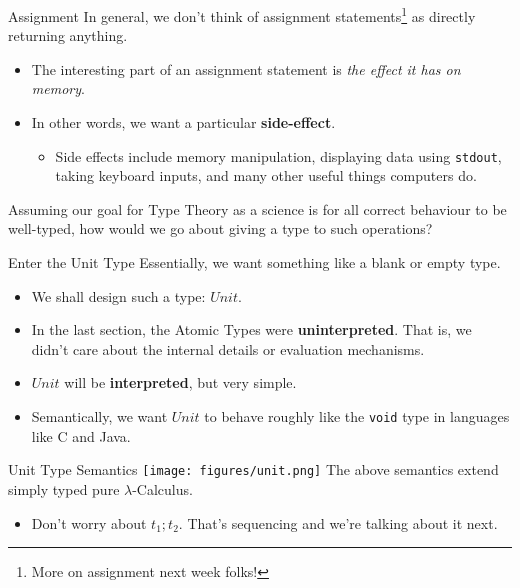 \documentclass[11pt]{beamer}
\begin{document}
\begin{frame}[fragile=singleslide]{Assignment}
In general, we don't think of assignment statements\footnote{More on assignment next week folks!} as directly returning anything.
\begin{itemize}
\item The interesting part of an assignment statement is \emph{the effect it has on memory}.
\item In other words, we want a particular \textbf{side-effect}.
\begin{itemize}
 \item Side effects include memory manipulation, displaying data using \texttt{stdout}, taking keyboard inputs, and many other useful things computers do.
 \end{itemize}
\end{itemize}
Assuming our goal for Type Theory as a science is for all correct behaviour to be well-typed, how would we go about giving a type to such operations?
\end{frame}

\begin{frame}[fragile=singleslide]{Enter the Unit Type}
Essentially, we want something like a blank or empty type.
\begin{itemize}
\item We shall design such a type: $Unit$.
\item In the last section, the Atomic Types were \textbf{uninterpreted}.  That is, we didn't care about the internal details or evaluation mechanisms.
\item $Unit$ will be \textbf{interpreted}, but very simple.  
\item Semantically, we want $Unit$ to behave roughly like the \texttt{void} type in languages like C and Java.
\end{itemize}
\end{frame}

\begin{frame}[fragile=singleslide]{Unit Type Semantics}
\texttt{[image: figures/unit.png]} 
The above semantics extend simply typed pure $\lambda$-Calculus. 
\begin{itemize}
\item Don't worry about $t_1 ; t_2$.  That's sequencing and we're talking about it next. 
 \end{itemize} 
\end{frame}
\end{document}
